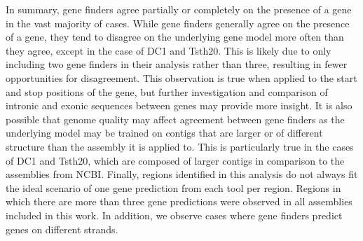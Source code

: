 In summary, gene finders agree partially or completely on the presence
of a gene in the vast majority of cases. While gene finders generally
agree on the presence of a gene, they tend to disagree on the
underlying gene model more often than they agree, except in the
case of DC1 and Tsth20. This is likely due to only including two gene
finders in their analysis rather than three, resulting in fewer
opportunities for disagreement. This observation is true when applied
to the start and stop positions of the gene, but further investigation
and comparison of intronic and exonic sequences between genes may
provide more insight. It is also possible that genome quality may
affect agreement between gene finders as the underlying model may be
trained on contigs that are larger or of different structure than the
assembly it is applied to. This is particularly true in the cases of
DC1 and Tsth20, which are composed of larger contigs in comparison to
the assemblies from NCBI. Finally, regions identified in this analysis
do not always fit the ideal scenario of one gene prediction from each
tool per region. Regions in which there are more than three gene
predictions were observed in all assemblies included in this work. In
addition, we observe cases where gene finders predict genes on
different strands.
